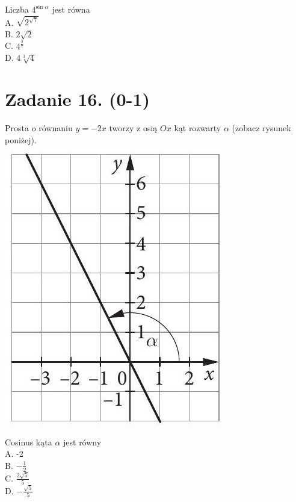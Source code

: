 \documentclass[10pt]{article}
\begin{document}
Liczba \(4^{\text {sin } \alpha}\) jest równa\\
A. \(\sqrt{2^{\sqrt{7}}}\)\\
B. \(2 \sqrt{2}\)\\
C. \(4^{\frac{3}{7}}\)\\
D. \(4 \sqrt[3]{4}\)

\section*{Zadanie 16. (0-1)}
Prosta o równaniu \(y=-2 x\) tworzy z osią \(O x\) kąt rozwarty \(\alpha\) (zobacz rysunek poniżej).\\
\includegraphics[max width=\textwidth, center]{2024_11_21_72158d4a4efa7dd894bcg-06(1)}

Cosinus kąta \(\alpha\) jest równy\\
A. -2\\
B. \(-\frac{1}{2}\)\\
C. \(\frac{2 \sqrt{5}}{5}\)\\
D. \(-\frac{\sqrt{5}}{5}\)
\end{document}
